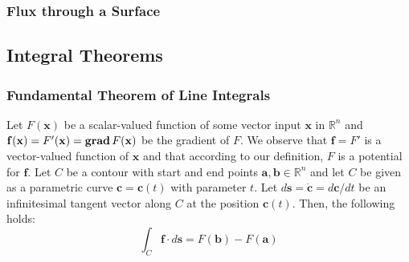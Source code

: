 \subsubsection{Flux through a Surface}

\subsection{Integral Theorems}

\subsubsection{Fundamental Theorem of Line Integrals}
Let $F(\mathbf{x})$ be a scalar-valued function of some vector input $\mathbf{x}$ in $\mathbb{R}^n$ and $\mathbf{f(x)} = F'(\mathbf{x}) = \operatorname{\mathbf{grad}} F(\mathbf{x})$ be the gradient of $F$. We observe that $\mathbf{f} = F'$ is a vector-valued function of $\mathbf{x}$ and that according to our definition, $F$ is a potential for $\mathbf{f}$. Let $C$ be a contour with start and end points $\mathbf{a,b} \in \mathbb{R}^n$ and let $C$ be given as a parametric curve $\mathbf{c} = \mathbf{c}(t)$ with parameter $t$. Let $d\mathbf{s} = \dot{\mathbf{c}} = d\mathbf{c} / dt$ be an infinitesimal tangent vector along $C$ at the position $\mathbf{c}(t)$. Then, the following holds:
\begin{equation}
 \int_C \mathbf{f} \cdot d\mathbf{s} 
 = F(\mathbf{b}) - F(\mathbf{a}) 
\end{equation}
